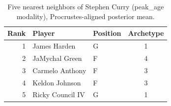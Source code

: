 \begin{table}[htbp]
  \centering\small
  \begin{tabular}{rllc}
    \toprule
    Rank & Player & Position & Archetype \\
    \midrule
    1 & James Harden & G & 1 \\
    2 & JaMychal Green & F & 4 \\
    3 & Carmelo Anthony & F & 3 \\
    4 & Keldon Johnson & F & 3 \\
    5 & Ricky Council IV & G & 1 \\
    \bottomrule
  \end{tabular}
  \caption{Five nearest neighbors of Stephen Curry (peak_age modality), Procrustes-aligned posterior mean.}
  \label{tab:Stephen_Curry_neighbors_peak_age}
\end{table}

